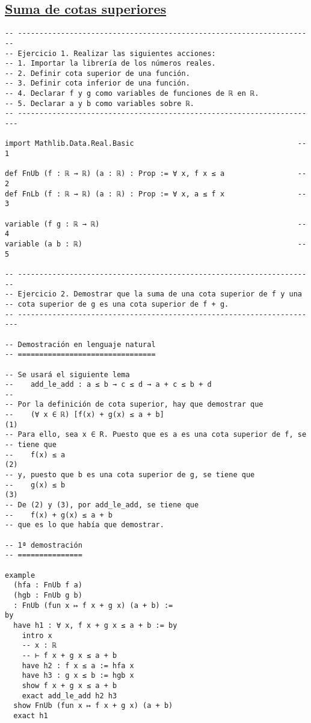 \subsection{\href{./src/Logica/Suma\_de\_cotas\_superiores.lean}{Suma de cotas superiores}}
\label{sec:orgd59e56a}
\begin{verbatim}
-- ---------------------------------------------------------------------
-- Ejercicio 1. Realizar las siguientes acciones:
-- 1. Importar la librería de los números reales.
-- 2. Definir cota superior de una función.
-- 3. Definir cota inferior de una función.
-- 4. Declarar f y g como variables de funciones de ℝ en ℝ.
-- 5. Declarar a y b como variables sobre ℝ.
-- ----------------------------------------------------------------------

import Mathlib.Data.Real.Basic                                      -- 1

def FnUb (f : ℝ → ℝ) (a : ℝ) : Prop := ∀ x, f x ≤ a                 -- 2
def FnLb (f : ℝ → ℝ) (a : ℝ) : Prop := ∀ x, a ≤ f x                 -- 3

variable (f g : ℝ → ℝ)                                              -- 4
variable (a b : ℝ)                                                  -- 5

-- ---------------------------------------------------------------------
-- Ejercicio 2. Demostrar que la suma de una cota superior de f y una
-- cota superior de g es una cota superior de f + g.
-- ----------------------------------------------------------------------

-- Demostración en lenguaje natural
-- ================================

-- Se usará el siguiente lema
--    add_le_add : a ≤ b → c ≤ d → a + c ≤ b + d
--
-- Por la definición de cota superior, hay que demostrar que
--    (∀ x ∈ ℝ) [f(x) + g(x) ≤ a + b]                                  (1)
-- Para ello, sea x ∈ R. Puesto que es a es una cota superior de f, se
-- tiene que
--    f(x) ≤ a                                                         (2)
-- y, puesto que b es una cota superior de g, se tiene que
--    g(x) ≤ b                                                         (3)
-- De (2) y (3), por add_le_add, se tiene que
--    f(x) + g(x) ≤ a + b
-- que es lo que había que demostrar.

-- 1ª demostración
-- ===============

example
  (hfa : FnUb f a)
  (hgb : FnUb g b)
  : FnUb (fun x ↦ f x + g x) (a + b) :=
by
  have h1 : ∀ x, f x + g x ≤ a + b := by
    intro x
    -- x : ℝ
    -- ⊢ f x + g x ≤ a + b
    have h2 : f x ≤ a := hfa x
    have h3 : g x ≤ b := hgb x
    show f x + g x ≤ a + b
    exact add_le_add h2 h3
  show FnUb (fun x ↦ f x + g x) (a + b)
  exact h1


\end{verbatim}
